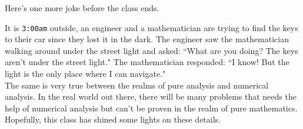 \documentclass{article}
\begin{document}
Here's one more joke before the class ends.
\begin{remark}
    It is \texttt{3:00am} outside, an engineer and a mathematician are trying to find the keys to their car since they lost it in the dark. The engineer saw the mathematician walking around under the street light and asked: ``What are you doing? The keys aren't under the street light." The mathematician responded: ``I know! But the light is the only place where I can navigate."\\
    
    The same is very true between the realms of pure analysis and numerical analysis. In the real world out there, there will be many problems that needs the help of numerical analysis but can't be proven in the realm of pure mathematics. Hopefully, this class has shined some lights on these details.
\end{remark}

\end{document}
